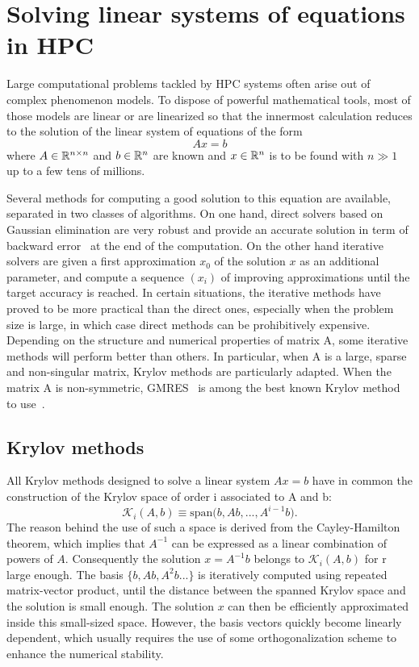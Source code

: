 \section{Solving linear systems of equations in HPC}
Large computational problems tackled by HPC systems often arise out of complex phenomenon models. To dispose of powerful mathematical tools, most of those models are linear or are linearized so that the innermost calculation reduces to the solution of the linear system of equations of the form
$$
A x = b
$$
where $A \in \Bbb{R}^{n\times n}$ and $b\in \Bbb{R}^n$ are known and $x \in \Bbb{R}^n$  is to be found with $n \gg 1$ up to a few tens of millions.

 Several methods for computing a good solution to this equation are available, separated in two classes of algorithms. On one hand, direct solvers based on Gaussian elimination \cite{direct_solver} are very robust and provide an accurate solution in term of backward error~\cite{hig:02} 
at the end of the computation. On the other hand iterative solvers are given a first approximation $x_0$ of the solution $x$ as an additional parameter, and compute a sequence $(x_i)$ of improving approximations until the target accuracy is reached. In certain situations, the iterative methods have proved to be more practical than the direct ones, especially when the problem size is large, in which case direct methods can be prohibitively expensive. Depending on the structure and numerical properties of matrix A, some iterative methods will perform better than others. In particular, when A is a large, sparse and non-singular matrix, Krylov methods are particularly adapted. When the matrix A is non-symmetric, GMRES~\cite{gmres} is among the best known Krylov method to use~\cite{Saad:2003}.

\subsection{Krylov methods}
All Krylov methods designed to solve a linear system $Ax = b$ have in common the construction of the Krylov space of order i associated to A and b: $$\mathcal{K}_i(A, b) \equiv \text{span(}b, Ab, ..., A^{i-1}b\text{)}.$$ The reason behind the use of such a space is derived from the Cayley-Hamilton theorem, which implies that $A^{-1}$ can be expressed as a linear combination of powers of $A$. Consequently the solution $x = A^{-1}b$ belongs to $\mathcal{K}_i(A, b)$ for r large enough. The basis $\{b, Ab, A^2b...\}$ is iteratively computed using repeated matrix-vector product, until the distance between the spanned Krylov space and the solution is small enough. The solution $x$ can then be efficiently approximated inside this small-sized space. However, the basis vectors quickly become linearly dependent, which usually requires the use of some orthogonalization scheme to enhance the numerical stability.

